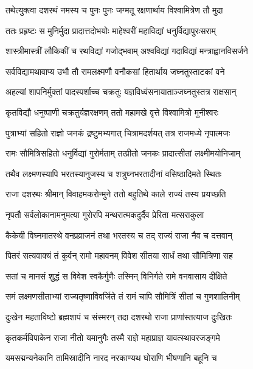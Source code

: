 \twolineshloka
{तथेत्युक्त्वा दशरथं नमस्य च पुनः पुनः}
{जग्मतू रक्षणार्थाय विश्वामित्रेण तौ मुदा} %

\twolineshloka
{ततः प्रहृष्टः स मुनिर्मुदा प्रादात्तदोभयोः}
{माहेश्वरीं महाविद्यां धनुर्विद्यापुरःसराम्} %

\twolineshloka
{शास्त्रीमास्त्रीं लौकिकीं च रथविद्यां गजोद्भवाम्}
{अश्वविद्यां गदाविद्यां मन्त्राह्वानविसर्जने} %

\twolineshloka
{सर्वविद्यामथावाप्य उभौ तौ रामलक्ष्मणौ}
{वनौकसां हितार्थाय जघ्नतुस्ताटकां वने} %

\twolineshloka
{अहल्यां शापनिर्मुक्तां पादस्पर्शाच्च चक्रतुः}
{यज्ञविध्वंसनायाताञ्जघ्नतुस्तत्र राक्षसान्} %

\twolineshloka
{कृतविद्यौ धनुष्पाणी चक्रतुर्यज्ञरक्षणम्}
{ततो महामखे वृत्ते विश्वामित्रो मुनीश्वरः} %

\twolineshloka
{पुत्राभ्यां सहितो राज्ञो जनकं द्रष्टुमभ्यगात्}
{चित्रामदर्शयत् तत्र राजमध्ये नृपात्मजः} %

\twolineshloka
{रामः सौमित्रिसहितो धनुर्विद्यां गुरोर्मताम्}
{तत्प्रीतो जनकः प्रादात्सीतां लक्ष्मीमयोनिजाम्} %

\twolineshloka
{तथैव लक्ष्मणस्यापि भरतस्यानुजस्य च}
{शत्रुघ्नभरतादीनां वसिष्ठादिमते स्थितः} %

\twolineshloka
{राजा दशरथः श्रीमान् विवाहमकरोन्मुने}
{ततो बहुतिथे काले राज्यं तस्य प्रयच्छति} %

\twolineshloka
{नृपतौ सर्वलोकानामनुमत्या गुरोरपि}
{मन्थरात्मकदुर्दैव प्रेरिता मत्सराकुला} %

\twolineshloka
{कैकेयी विघ्नमातस्थे वनप्रव्राजनं तथा}
{भरतस्य च तद् राज्यं राजा नैव च दत्तवान्} %

\twolineshloka
{पितरं सत्यवाक्यं तं कुर्वन् रामो महावनम्}
{विवेश सीतया सार्धं तथा सौमित्रिणा सह} %

\twolineshloka
{सतां च मानसं शुद्धं स विवेश स्वकैर्गुणैः}
{तस्मिन् विनिर्गते रामे वनवासाय दीक्षिते} %

\twolineshloka
{समं लक्ष्मणसीताभ्यां राज्यतृष्णाविवर्जिते}
{तं रामं चापि सौमित्रिं सीतां च गुणशालिनीम्} %

\twolineshloka
{दुःखेन महताविष्टो ब्रह्मशापं च संस्मरन्}
{तदा दशरथो राजा प्राणांस्तत्याज दुःखितः} %

\twolineshloka
{कृतकर्मविपाकेन राजा नीतो यमानुगैः}
{तस्मै राज्ञे महाप्राज्ञ यावत्स्थावरजङ्गमे} %

\twolineshloka
{यमसद्मन्यनेकानि तामिस्रादीनि नारद}
{नरकाण्यथ घोराणि भीषणानि बहूनि च} %

